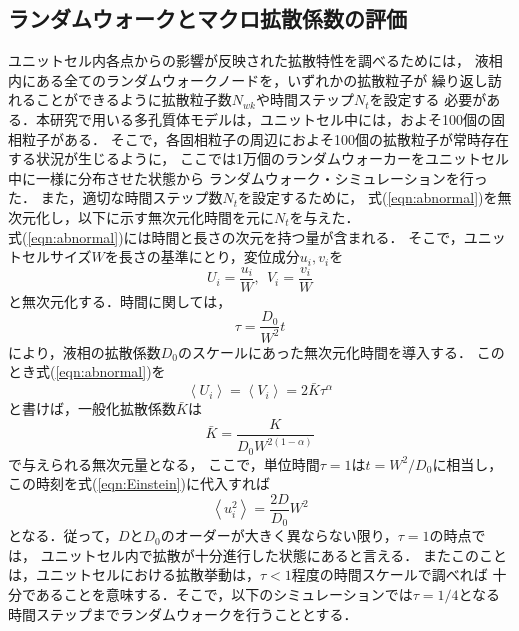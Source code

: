 \subsection{ランダムウォークとマクロ拡散係数の評価}
ユニットセル内各点からの影響が反映された拡散特性を調べるためには，
液相内にある全てのランダムウォークノードを，いずれかの拡散粒子が
繰り返し訪れることができるように拡散粒子数$N_{wk}$や時間ステップ$N_t$を設定する
必要がある．本研究で用いる多孔質体モデルは，ユニットセル中には，およそ100個の固相粒子がある．
そこで，各固相粒子の周辺におよそ100個の拡散粒子が常時存在する状況が生じるように， 
ここでは1万個のランダムウォーカーをユニットセル中に一様に分布させた状態から
ランダムウォーク・シミュレーションを行った．
また，適切な時間ステップ数$N_t$を設定するために，
式(\ref{eqn:abnormal})を無次元化し，以下に示す無次元化時間を元に$N_t$を与えた．\\
式(\ref{eqn:abnormal})には時間と長さの次元を持つ量が含まれる．
そこで，ユニットセルサイズ$W$を長さの基準にとり，変位成分$u_i,v_i$を
\begin{equation}
	U_i=\frac{u_i}{W},\ \  V_i=\frac{v_i}{W}
\end{equation}
と無次元化する．時間に関しては，
\begin{equation}
	\tau=\frac{D_0}{W^2}t
	\label{eqn:tau}
\end{equation}
により，液相の拡散係数$D_0$のスケールにあった無次元化時間を導入する．
このとき式(\ref{eqn:abnormal})を
\begin{equation}
	\left<U_i\right>=\left<V_i\right>=2\bar K \tau ^{\alpha}
	\label{eqn:Kb}
\end{equation}
と書けば，一般化拡散係数$\bar{K}$は
\begin{equation}
	\bar{K}=\frac{K}{D_0W^{2(1-\alpha)}}
	\label{eqn:Kb_def}
\end{equation}
で与えられる無次元量となる，
ここで，単位時間$\tau=1$は$t=W^2/D_0$に相当し，この時刻を式(\ref{eqn:Einstein})に代入すれば
\begin{equation}
	\left<u_i^2\right> =\frac{2D}{D_0}W^2
\end{equation}
となる．従って，$D$と$D_0$のオーダーが大きく異ならない限り，$\tau=1$の時点では，
ユニットセル内で拡散が十分進行した状態にあると言える．
またこのことは，ユニットセルにおける拡散挙動は，$\tau<1$程度の時間スケールで調べれば
十分であることを意味する．そこで，以下のシミュレーションでは$\tau=1/4$となる
時間ステップまでランダムウォークを行うこととする．
